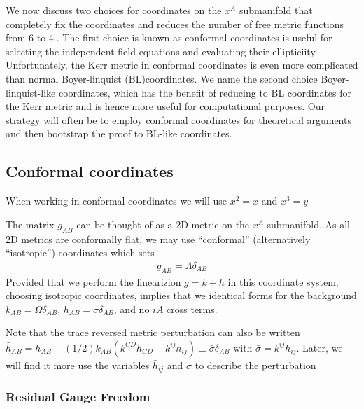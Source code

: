 \documentclass[aps,prd,amsmath,showpacs,amssymb,superscriptaddress,nofootinbib,longbibliography,eqsecnum,preprintnumbers]{revtex4-1}
\begin{document}
We now discuss two choices for coordinates on the $x^A$ submanifold that completely fix the coordinates and reduces the number of free metric functions from 6 to 4.. The first choice is known as conformal coordinates is useful for selecting the independent field equations and evaluating their ellipticiity. Unfortunately, the Kerr metric in conformal coordinates is even more complicated than normal Boyer-linquist (BL)coordinates. We name the second choice Boyer-linquist-like coordinates, which has the benefit of reducing to BL coordinates for the Kerr metric and is hence more useful for computational purposes. Our strategy will often be to employ conformal coordinates for theoretical arguments and then bootstrap the proof to BL-like coordinates.

\subsection{Conformal coordinates}


When working in conformal coordinates we will use $x^2=x$ and $x^3=y$

The matrix $g_{AB}$ can be thought of as a 2D metric on the $x^A$ submanifold. As all 2D metrics are conformally flat, we may use ``conformal'' (alternatively ``isotropic'') coordinates \cite{Stephani:2003tm} which sets 
\begin{align}
g_{AB}=\Lambda\delta_{AB}
\end{align}
Provided that we perform the linearizion $g=k+h$ in this coordinate system, choosing isotropic coordinates, implies that we identical forms for the background $k_{AB}=\Omega \delta_{AB}$, $h_{AB}=\sigma \delta_{AB}$, and no $iA$ cross terms.

Note that the trace reversed metric perturbation can also be written $\bar h_{AB}=h_{AB}-(1/2)k_{AB}(k^{CD}h_{CD}-k^{ij}h_{ij})\equiv\bar \sigma \delta_{AB}$ with $\bar\sigma=k^{ij}h_{ij}$. Later, we will find it more use the variables $\bar h_{ij}$ and $\bar \sigma$ to describe the perturbation

\subsubsection{Residual Gauge Freedom}
\end{document}
